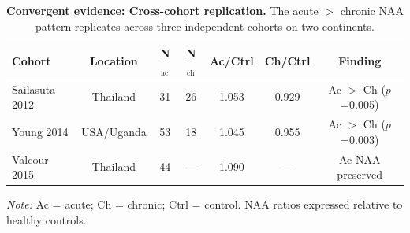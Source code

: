\documentclass[10pt,a4paper]{article}
\begin{document}
\begin{table}[htbp]
\centering
\caption{\textbf{Convergent evidence: Cross-cohort replication.} The acute $>$ chronic NAA pattern replicates across three independent cohorts on two continents.}
\label{tab:convergent_cohorts}
\small
\begin{tabular}{lcccccc}
\toprule
\textbf{Cohort} & \textbf{Location} & \textbf{N$_{\text{ac}}$} & \textbf{N$_{\text{ch}}$} & \textbf{Ac/Ctrl} & \textbf{Ch/Ctrl} & \textbf{Finding} \\
\midrule
Sailasuta 2012 & Thailand & 31 & 26 & 1.053 & 0.929 & Ac $>$ Ch ($p$=0.005) \\
Young 2014 & USA/Uganda & 53 & 18 & 1.045 & 0.955 & Ac $>$ Ch ($p$=0.003) \\
Valcour 2015 & Thailand & 44 & --- & 1.090 & --- & Ac NAA preserved \\
\bottomrule
\end{tabular}
\smallskip

\noindent\textit{Note:} Ac = acute; Ch = chronic; Ctrl = control. NAA ratios expressed relative to healthy controls.
\end{table}

\clearpage


\end{document}
